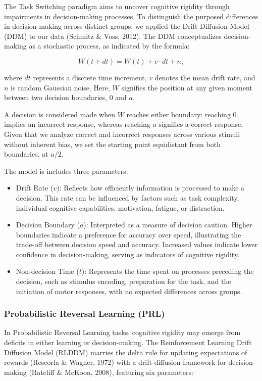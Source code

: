 \documentclass[
  man]{apa6}
\begin{document}
The Task Switching paradigm aims to uncover cognitive rigidity through impairments in decision-making processes. To distinguish the purposed differences in decision-making across distinct groups, we applied the Drift Diffusion Model (DDM) to our data (Schmitz \& Voss, 2012). The DDM conceptualizes decision-making as a stochastic process, as indicated by the formula:

\[W(t + dt) = W(t) + v \cdot dt + n,\]

where \(dt\) represents a discrete time increment, \(v\) denotes the mean drift rate, and \(n\) is random Gaussian noise. Here, \(W\) signifies the position at any given moment between two decision boundaries, 0 and \(a\).

A decision is considered made when \(W\) reaches either boundary: reaching 0 implies an incorrect response, whereas reaching \(a\) signifies a correct response. Given that we analyze correct and incorrect responses across various stimuli without inherent bias, we set the starting point equidistant from both boundaries, at \(a/2\).

The model is includes three parameters:

\begin{itemize}
\item
  Drift Rate (\(v\)): Reflects how efficiently information is processed to make a decision. This rate can be influenced by factors such as task complexity, individual cognitive capabilities, motivation, fatigue, or distraction.
\item
  Decision Boundary (\(a\)): Interpreted as a measure of decision caution. Higher boundaries indicate a preference for accuracy over speed, illustrating the trade-off between decision speed and accuracy. Increased values indicate lower confidence in decision-making, serving as indicators of cognitive rigidity.
\item
  Non-decision Time (\(t\)): Represents the time spent on processes preceding the decision, such as stimulus encoding, preparation for the task, and the initiation of motor responses, with no expected differences across groups.
\end{itemize}

\subsubsection{Probabilistic Reversal Learning (PRL)}\label{probabilistic-reversal-learning-prl}

In Probabilistic Reversal Learning tasks, cognitive rigidity may emerge from deficits in either learning or decision-making. The Reinforcement Learning Drift Diffusion Model (RLDDM) marries the delta rule for updating expectations of rewards (Rescorla \& Wagner, 1972) with a drift-diffusion framework for decision-making (Ratcliff \& McKoon, 2008), featuring six parameters:
\end{document}
